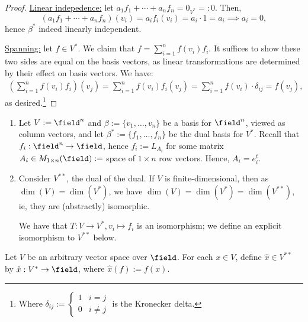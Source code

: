 \begin{proof}
    \underline{Linear indepedence:} let $a_1 f_1 + \cdots + a_n f_n = 0_{V^\ast}=: 0$. Then,
    \[
    (a_1f_1 + \cdots + a_n f_n)(v_i) = a_if_i(v_i) = a_i \cdot 1 = a_i \implies a_i = 0,    
    \]
    hence $\beta^\ast$ indeed linearly independent.

    \underline{Spanning:} let $f \in V^\ast$. We claim that $f = \sum_{i = 1}^n f(v_i) f_i$. It suffices to show these two sides are equal on the basis vectors, as linear transformations are determined by their effect on basis vectors. We have:
    \begin{align*}
       \left( \sum_{i=1}^n f(v_i) f_i\right)(v_j) = \sum_{i=1}^n f(v_i) f_i(v_j) = \sum_{i=1}^n f(v_i) \cdot \delta_{ij} = f(v_j),
    \end{align*}
    as desired.\footnote{Where $\delta_{ij} := \begin{cases}
        1 & i = j\\
        0 & i \neq j
    \end{cases}$ is the Kronecker delta.}
\end{proof}

\begin{example}
    \begin{enumerate}
    \item Let $V := \field^n$ and $\beta := \{v_1, \dots, v_n\}$ be a basis for $\field^n$, viewed as column vectors, and let $\beta^\ast := \{f_1, \dots, f_n\}$ be the dual basis for $V^\ast$. Recall that $f_i : \field^n \to \field$, hence $f_i := L_{A_i}$ for some matrix $A_i \in M_{1 \times n}(\field) :=$ space of $1 \times n$ row vectors. Hence, $A_i = e_i^t$.
    \item Consider $V^{\ast \ast}$, the dual of the dual. If $V$ is finite-dimensional, then as $\dim(V)= \dim(V^\ast)$, we have $\dim(V) = \dim(V^\ast) = \dim(V^{\ast \ast})$, ie, they are (abstractly) isomorphic.
    
    We have that $T : V \to V^\ast, v_i \mapsto f_i$ is an isomorphism; we define an explicit isomorphism to $V^{\ast \ast}$ below.
\end{enumerate}
\end{example}

\begin{definition}
Let $V$ be an arbitrary vector space over $\field$. For each $x \in V$, define $\hat x\in V^{\ast \ast}$ by $\hat x : V^\ast \to \field$, where $\hat{x}(f) := f(x)$.
\end{definition}

